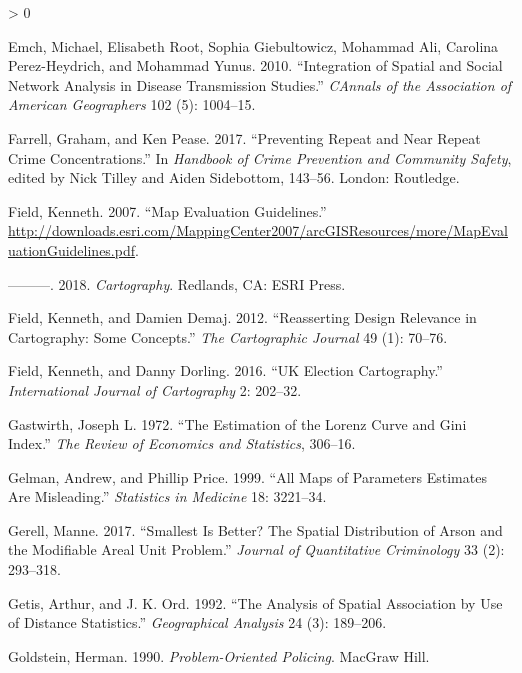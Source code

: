 \documentclass[
  krantz2]{krantz}
\newlength{\cslhangindent}
\newenvironment{CSLReferences}[2] %
 {%
  \setlength{\parindent}{0pt}
  \ifodd #1 \everypar{\setlength{\hangindent}{\cslhangindent}}\ignorespaces\fi
  \ifnum #2 > 0
  \setlength{\parskip}{#2\baselineskip}
  \fi
 }%
 {}
\begin{document}
\begin{CSLReferences}{1}{0}
\leavevmode\hypertarget{ref-Emch_2010}{}%
Emch, Michael, Elisabeth Root, Sophia Giebultowicz, Mohammad Ali, Carolina Perez-Heydrich, and Mohammad Yunus. 2010. {``Integration of Spatial and Social Network Analysis in Disease Transmission Studies.''} \emph{CAnnals of the Association of American Geographers} 102 (5): 1004--15.

\leavevmode\hypertarget{ref-Farrell_2017}{}%
Farrell, Graham, and Ken Pease. 2017. {``Preventing Repeat and Near Repeat Crime Concentrations.''} In \emph{Handbook of Crime Prevention and Community Safety}, edited by Nick Tilley and Aiden Sidebottom, 143--56. London: Routledge.

\leavevmode\hypertarget{ref-Field_2007}{}%
Field, Kenneth. 2007. {``Map Evaluation Guidelines.''} \url{http://downloads.esri.com/MappingCenter2007/arcGISResources/more/MapEvaluationGuidelines.pdf}.

\leavevmode\hypertarget{ref-Field_2018}{}%
---------. 2018. \emph{Cartography}. Redlands, CA: ESRI Press.

\leavevmode\hypertarget{ref-Field_2012}{}%
Field, Kenneth, and Damien Demaj. 2012. {``Reasserting Design Relevance in Cartography: Some Concepts.''} \emph{The Cartographic Journal} 49 (1): 70--76.

\leavevmode\hypertarget{ref-Field_2016}{}%
Field, Kenneth, and Danny Dorling. 2016. {``UK Election Cartography.''} \emph{International Journal of Cartography} 2: 202--32.

\leavevmode\hypertarget{ref-gastwirth1972estimation}{}%
Gastwirth, Joseph L. 1972. {``The Estimation of the Lorenz Curve and Gini Index.''} \emph{The Review of Economics and Statistics}, 306--16.

\leavevmode\hypertarget{ref-Gelman_1999}{}%
Gelman, Andrew, and Phillip Price. 1999. {``All Maps of Parameters Estimates Are Misleading.''} \emph{Statistics in Medicine} 18: 3221--34.

\leavevmode\hypertarget{ref-Gerell_2017}{}%
Gerell, Manne. 2017. {``Smallest Is Better? The Spatial Distribution of Arson and the Modifiable Areal Unit Problem.''} \emph{Journal of Quantitative Criminology} 33 (2): 293--318.

\leavevmode\hypertarget{ref-Getis_1992}{}%
Getis, Arthur, and J. K. Ord. 1992. {``The Analysis of Spatial Association by Use of Distance Statistics.''} \emph{Geographical Analysis} 24 (3): 189--206.

\leavevmode\hypertarget{ref-Goldstein_1990}{}%
Goldstein, Herman. 1990. \emph{Problem-Oriented Policing}. MacGraw Hill.


\end{CSLReferences}
\end{document}

